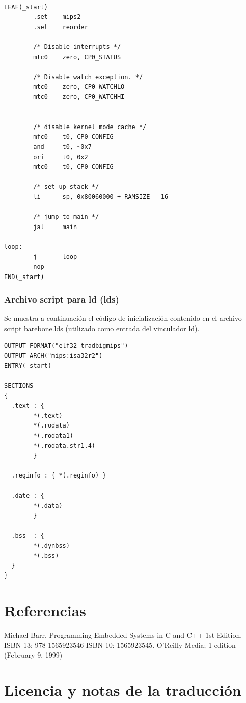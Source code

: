 \documentclass[output=paper, 
colorlinks,
citecolor=brown,
newtxmath
]{langscibook}
\begin{document}
\begin{verbatim}

LEAF(_start)
        .set    mips2
        .set    reorder

        /* Disable interrupts */
        mtc0    zero, CP0_STATUS

        /* Disable watch exception. */
        mtc0    zero, CP0_WATCHLO
        mtc0    zero, CP0_WATCHHI


        /* disable kernel mode cache */
        mfc0    t0, CP0_CONFIG
        and     t0, ~0x7
        ori     t0, 0x2
        mtc0    t0, CP0_CONFIG

        /* set up stack */
        li      sp, 0x80060000 + RAMSIZE - 16

        /* jump to main */
        jal     main

loop:
        j       loop
        nop
END(_start)
\end{verbatim}

\subsubsection {Archivo script para ld (lds)}

Se muestra a continuación el código de inicialización contenido en el archivo
script barebone.lds (utilizado como entrada del vinculador ld). 

\begin{verbatim}
OUTPUT_FORMAT("elf32-tradbigmips")
OUTPUT_ARCH("mips:isa32r2")
ENTRY(_start)

SECTIONS
{
  .text : {
        *(.text)
        *(.rodata)
        *(.rodata1)
        *(.rodata.str1.4)
        }

  .reginfo : { *(.reginfo) }

  .date : {
        *(.data)
        }

  .bss  : {
        *(.dynbss)
        *(.bss)
  }
}
\end{verbatim}


\pagebreak

\section{Referencias}

Michael Barr. Programming Embedded Systems in C and C++ 1st Edition. ISBN-13: 978-1565923546
ISBN-10: 1565923545. O'Reilly Media; 1 edition (February 9, 1999)


\section*{Licencia y notas de la traducción}
\end{document}
